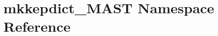 \hypertarget{namespacemkkepdict__MAST}{\section{mkkepdict\-\_\-\-M\-A\-S\-T Namespace Reference}
\label{namespacemkkepdict__MAST}
}
